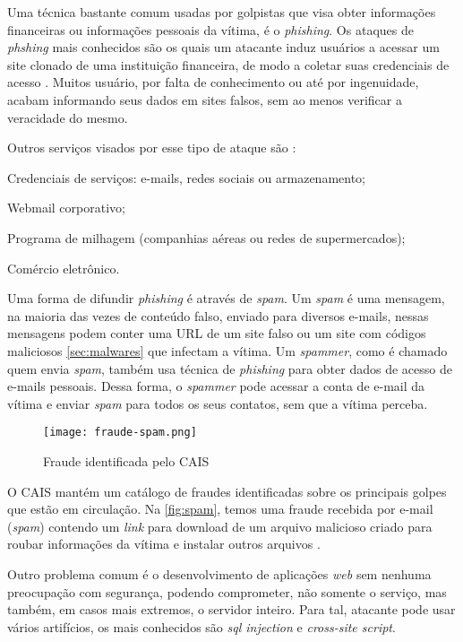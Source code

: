 Uma técnica bastante comum usadas por golpistas que visa obter informações financeiras ou informações pessoais da vítima, é o \textit{phishing}. Os ataques de \textit{phshing} mais conhecidos são os quais um atacante induz usuários a acessar um site clonado de uma instituição financeira, de modo a coletar suas credenciais de acesso \cite{esr:tratamento}. Muitos usuário, por falta de conhecimento ou até por ingenuidade, acabam informando seus dados em sites falsos, sem ao menos verificar a veracidade do mesmo.

Outros serviços visados por esse tipo de ataque são \cite{esr:tratamento}:
\begin{alineas}
\item Credenciais de serviços: e-mails, redes sociais ou armazenamento;
\item Webmail corporativo; 
\item Programa de milhagem (companhias aéreas ou redes de supermercados);
\item Comércio eletrônico.
\end{alineas}

Uma forma de difundir \textit{phishing} é através de \textit{spam}. Um \textit{spam} é uma mensagem, na maioria das vezes de conteúdo falso, enviado para diversos e-mails, nessas mensagens podem conter uma URL de um site falso ou um site com códigos maliciosos \autoref{sec:malwares} que infectam a vítima. Um \textit{spammer}, como é chamado quem envia \textit{spam}, também usa técnica de \textit{phishing} para obter dados de acesso de e-mails pessoais. Dessa forma, o \textit{spammer} pode acessar a conta de e-mail da vítima e enviar \textit{spam} para todos os seus contatos, sem que a vítima perceba.

\begin{figure}[htb]
 \centering
 \caption{Fraude identificada pelo CAIS}
 \texttt{[image: fraude-spam.png]}
 \label{fig:spam}
\end{figure}

O CAIS mantém um catálogo de fraudes identificadas sobre os principais golpes que estão em circulação. Na \autoref{fig:spam}, temos uma fraude recebida por e-mail (\textit{spam}) contendo um \textit{link} para download de um arquivo malicioso criado para roubar informações da vítima e instalar outros arquivos \cite{cais}.

Outro problema comum é o desenvolvimento de aplicações \textit{web} sem nenhuma preocupação com segurança, podendo comprometer, não somente o serviço, mas também, em casos mais extremos, o servidor inteiro. Para tal, atacante pode usar vários artifícios, os mais conhecidos são \textit{sql injection} e \textit{cross-site script}.

